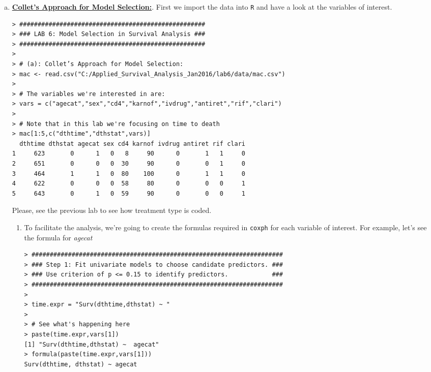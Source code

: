 \begin{enumerate}[(a)]
\item \textbf{\underline{Collet’s Approach for Model Selection:}}. First we import the data into \verb|R| and have a look at the variables of interest.
\begin{spacing}{1.2}
\begin{footnotesize}
\begin{verbatim}
> ###################################################
> ### LAB 6: Model Selection in Survival Analysis ###
> ###################################################
> 
> # (a): Collet’s Approach for Model Selection:
> mac <- read.csv("C:/Applied_Survival_Analysis_Jan2016/lab6/data/mac.csv")
> 
> # The variables we're interested in are:
> vars = c("agecat","sex","cd4","karnof","ivdrug","antiret","rif","clari")
> 
> # Note that in this lab we're focusing on time to death
> mac[1:5,c("dthtime","dthstat",vars)]
  dthtime dthstat agecat sex cd4 karnof ivdrug antiret rif clari
1     623       0      1   0   8     90      0       1   1     0
2     651       0      0   0  30     90      0       0   1     0
3     464       1      1   0  80    100      0       1   1     0
4     622       0      0   0  58     80      0       0   0     1
5     643       0      1   0  59     90      0       0   0     1
\end{verbatim}
\end{footnotesize}
\end{spacing}
Please, see the previous lab to see how treatment type is coded. 
\begin{enumerate}[Step 1:]
\item To facilitate the analysis, we're going to create the formulas required in \verb|coxph| for each variable of interest. For example, let's see the formula for \emph{agecat}
\begin{spacing}{1.2}
\begin{footnotesize}
\begin{verbatim}
> #####################################################################
> ### Step 1: Fit univariate models to choose candidate predictors. ###
> ### Use criterion of p <= 0.15 to identify predictors.            ###
> #####################################################################
> 
> time.expr = "Surv(dthtime,dthstat) ~ "
> 
> # See what's happening here
> paste(time.expr,vars[1])
[1] "Surv(dthtime,dthstat) ~  agecat"
> formula(paste(time.expr,vars[1]))
Surv(dthtime, dthstat) ~ agecat
\end{verbatim}
\end{footnotesize}

\end{spacing}
\end{enumerate}
\end{enumerate}
